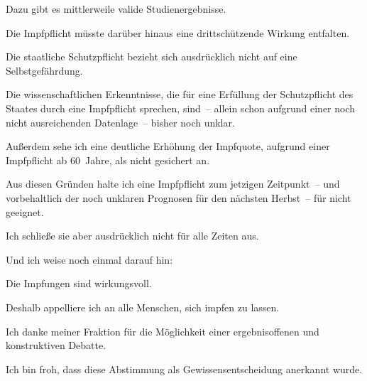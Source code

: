 \documentclass{article}
\begin{document}
\colorbox{CustomColor7}{\parbox{\linewidth}{Dazu gibt es mittlerweile valide Studienergebnisse.}}

\colorbox{CustomColor7}{\parbox{\linewidth}{Die Impfpflicht müsste darüber hinaus eine drittschützende Wirkung entfalten.}}

\colorbox{CustomColor7}{\parbox{\linewidth}{Die staatliche Schutzpflicht bezieht sich ausdrücklich nicht auf eine Selbstgefährdung.}}

\colorbox{CustomColor18}{\parbox{\linewidth}{Die wissenschaftlichen Erkenntnisse, die für eine Erfüllung der Schutzpflicht des Staates durch eine Impfpflicht sprechen, sind – allein schon aufgrund einer noch nicht ausreichenden Datenlage – bisher noch unklar.}}

\colorbox{CustomColor19}{\parbox{\linewidth}{Außerdem sehe ich eine deutliche Erhöhung der Impfquote, aufgrund einer Impfpflicht ab 60 Jahre, als nicht gesichert an.}}

\colorbox{CustomColor20}{\parbox{\linewidth}{Aus diesen Gründen halte ich eine Impfpflicht zum jetzigen Zeitpunkt – und vorbehaltlich der noch unklaren Prognosen für den nächsten Herbst – für nicht geeignet.}}

\colorbox{CustomColor21}{\parbox{\linewidth}{Ich schließe sie aber ausdrücklich nicht für alle Zeiten aus.}}

\colorbox{CustomColor22}{\parbox{\linewidth}{Und ich weise noch einmal darauf hin:}}

\colorbox{CustomColor23}{\parbox{\linewidth}{Die Impfungen sind wirkungsvoll.}}

\colorbox{CustomColor7}{\parbox{\linewidth}{Deshalb appelliere ich an alle Menschen, sich impfen zu lassen.}}

\colorbox{CustomColor24}{\parbox{\linewidth}{Ich danke meiner Fraktion für die Möglichkeit einer ergebnisoffenen und konstruktiven Debatte.}}

\colorbox{CustomColor25}{\parbox{\linewidth}{Ich bin froh, dass diese Abstimmung als Gewissensentscheidung anerkannt wurde.}}
\end{document}
